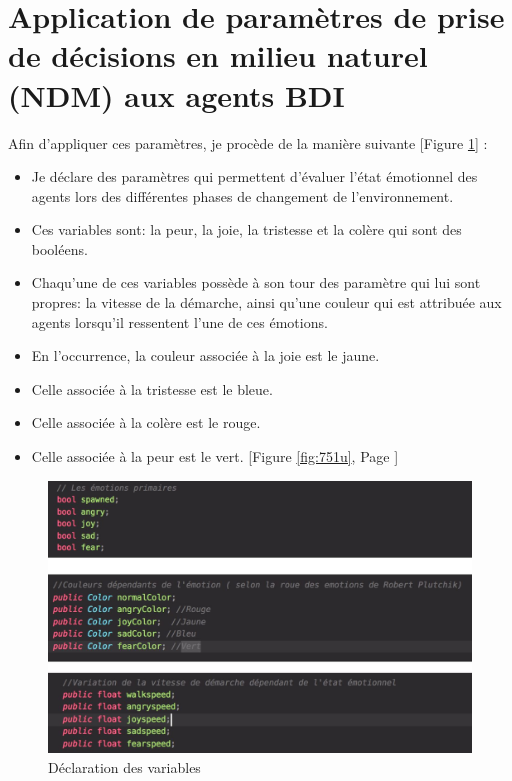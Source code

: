 \section{Application de paramètres de prise de décisions en milieu naturel (NDM) aux agents BDI}

Afin d’appliquer ces paramètres, je procède de la manière suivante [Figure \ref{fig:75}] : 

\begin{itemize}
\item Je déclare des paramètres qui permettent d’évaluer l’état émotionnel des agents lors des différentes phases de changement de l’environnement.
\item Ces variables sont: la peur, la joie, la tristesse et la colère qui sont des booléens.
\item Chaqu’une de ces variables possède à son tour des paramètre qui lui sont propres: la vitesse de la démarche, ainsi qu'une couleur qui est attribuée aux agents lorsqu'il ressentent l'une de ces émotions.
\item En l'occurrence, la couleur associée à la joie est le jaune.
\item Celle associée à la tristesse est le bleue.
\item Celle associée à la colère est le rouge.
\item Celle associée à la peur est le vert. [Figure \ref{fig:751u}, Page \pageref{fig:751u}]
\end{itemize} 

\begin{figure}[th]
\centering
\includegraphics{Figures/75unity.JPG}
\decoRule
\caption[Déclaration des variables]{Déclaration des variables}
\label{fig:75}
\end{figure}



